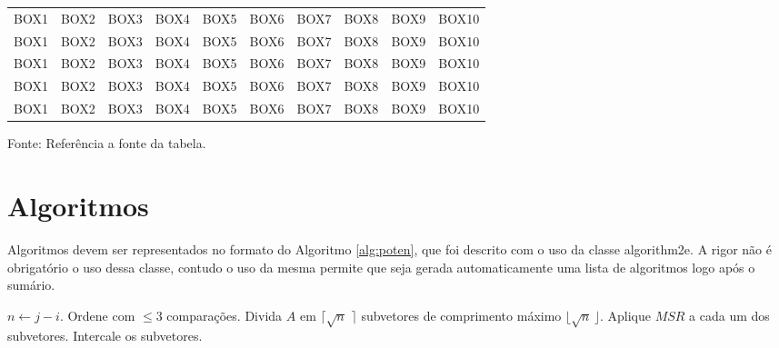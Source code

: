 \begin{landscape}
\begin{longtable}[c]{c|c|c|c|c|c|c|c|c|c}
	BOX1 & BOX2 & BOX3 & BOX4 & BOX5 & BOX6 &	BOX7 & BOX8 & BOX9 & BOX10 \\
	BOX1 & BOX2 & BOX3 & BOX4 & BOX5 & BOX6 &	BOX7 & BOX8 & BOX9 & BOX10 \\
	BOX1 & BOX2 & BOX3 & BOX4 & BOX5 & BOX6 &	BOX7 & BOX8 & BOX9 & BOX10 \\
	BOX1 & BOX2 & BOX3 & BOX4 & BOX5 & BOX6 &	BOX7 & BOX8 & BOX9 & BOX10 \\
	BOX1 & BOX2 & BOX3 & BOX4 & BOX5 & BOX6 &	BOX7 & BOX8 & BOX9 & BOX10 \\
\hline
\end{longtable}
\vspace{-8mm}
\begin{center}
\footnotesize
Fonte: Referência a fonte da tabela.
\end{center}
\end{landscape}

\section{Algoritmos}
\label{sec:algor} 
Algoritmos devem ser representados no formato do Algoritmo \ref{alg:poten}, que foi descrito com o uso da classe \textsf{algorithm2e}. A rigor não é obrigatório o uso dessa classe, contudo o uso da mesma permite que seja gerada automaticamente uma lista de algoritmos logo após o sumário.

\medskip
\begin{center}
\begin{minipage}{0.92\textwidth}
\begin{algorithm2e}[H]
 \DontPrintSemicolon
 \LinesNumbered
 \SetAlgoLined
 \BlankLine
 \BlankLine
 $n \leftarrow j - i$.\;
   {Ordene com $\leq 3$ comparações.}
   {Divida $A$ em $\lceil\sqrt{n}\,\,\rceil$ subvetores de comprimento máximo $\lfloor\sqrt{n}\,\rfloor$.\;
    Aplique $MSR$ a cada um dos subvetores.\;
    Intercale os subvetores.\;}
\caption{$MSR(A,i,j)$ \label {alg:poten}}
\end{algorithm2e}
\end{minipage}
\end{center}

